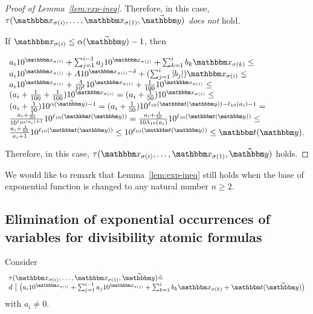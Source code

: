 \begin{proof}[Proof of Lemma~\ref{lem:exp-ineq}]
Therefore, in this case, $\tau(\ivarx_{\sigma(i)}, \ldots, \ivarx_{\sigma(1)}, \vec{\ivary})$ \emph{does not} hold.

If $\ivarx_{\sigma(i)} \le   \alpha(\vec{\ivary}) - 1$, then 

$
\begin{array}{l}
a_i 10^{\ivarx_{\sigma(i)}}+\sum_{j=1}^{i-1} a_j 10^{\ivarx_{\sigma(j)}} + \sum_{k=1}^{i}b_k \ivarx_{\sigma(k)} \le \\
a_i 10^{\ivarx_{\sigma(i)}} + A 10^{\ivarx_{\sigma(i)} - \delta} + (\sum_{j=1}^{i}|b_j|) \ivarx_{\sigma(i)} \le \\
a_i 10^{\ivarx_{\sigma(i)}} + \frac{A} {10^\delta}10^{\ivarx_{\sigma(i)}} + \frac{1}{100} 10^{\ivarx_{\sigma(i)}} \le \\
(a_i + \frac{1}{100} + \frac{1}{100})10^{\ivarx_{\sigma(i)}} = (a_i + \frac{1}{50}) 10^{\ivarx_{\sigma(i)}} \le \\
(a_i + \frac{1}{50}) 10^{\alpha(\vec{\ivary}) - 1} = (a_i + \frac{1}{50}) 10^{\ell_{10}(\iterm(\ivary))- \ell_{10}(a_i) - 1} = \\
\frac{a_i + \frac{1}{50}} {10^{\ell_{10}(a_i) + 1}} 10^{\ell_{10}(\iterm(\ivary))} = \frac{a_i + \frac{1}{50}} {10 \lambda_{10}(a_i)} 10^{\ell_{10}(\iterm(\ivary))} \le \\
\frac{a_i + \frac{1}{50}} {a_i+1} 10^{\ell_{10}(\iterm(\ivary))} \le 10^{\ell_{10}(\iterm(\ivary))} \le \iterm(\ivary).
\end{array}
$

Therefore,  in this case, $\tau(\ivarx_{\sigma(i)}, \ldots, \ivarx_{\sigma(1)}, \vec{\ivary})$ holds.


\end{proof}

We would like to remark that Lemma~\ref{lem:exp-ineq} still holds when the base of exponential function is changed to any natural number $n\ge 2$.


\subsection{Elimination of exponential occurrences of variables for divisibility atomic formulas}\label{app-div}

Consider
%
$$
\begin{array}{l}
\tau(\ivarx_{\sigma(i)}, \ldots, \ivarx_{\sigma(1)}, \vec{\ivary}) \Def  \\
d\ \big |\ \big(a_i 10^{\ivarx_{\sigma(i)}} + \sum_{j=1}^{i-1} a_j 10^{\ivarx_{\sigma(j)}} + \sum_{k=1}^{i} b_k \ivarx_{\sigma(k)} 
+ \iterm(\vec{\ivary}) \big)
\end{array}
$$
with $a_i \neq 0$.
%


